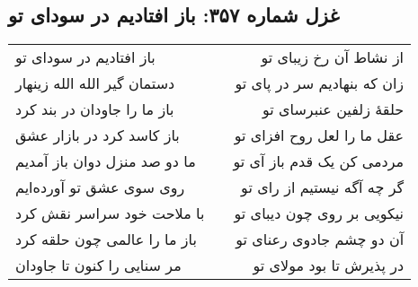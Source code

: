 \begin{center}
\section*{غزل شماره ۳۵۷: باز افتادیم در سودای تو}
\label{sec:357}
\begin{longtable}{l p{0.5cm} r}
باز افتادیم در سودای تو
&&
از نشاط آن رخ زیبای تو
\\
دستمان گیر الله الله زینهار
&&
زان که بنهادیم سر در پای تو
\\
باز ما را جاودان در بند کرد
&&
حلقهٔ زلفین عنبرسای تو
\\
باز کاسد کرد در بازار عشق
&&
عقل ما را لعل روح افزای تو
\\
ما دو صد منزل دوان باز آمدیم
&&
مردمی کن یک قدم باز آی تو
\\
روی سوی عشق تو آورده‌ایم
&&
گر چه آگه نیستیم از رای تو
\\
با ملاحت خود سراسر نقش کرد
&&
نیکویی بر روی چون دیبای تو
\\
باز ما را عالمی چون حلقه کرد
&&
آن دو چشم جادوی رعنای تو
\\
مر سنایی را کنون تا جاودان
&&
در پذیرش تا بود مولای تو
\\
\end{longtable}
\end{center}
